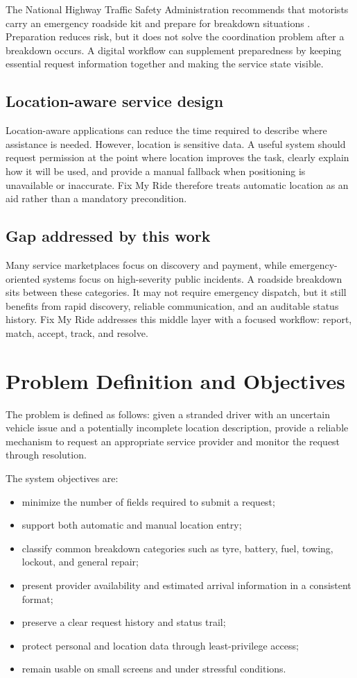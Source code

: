 \documentclass[conference]{IEEEtran}
\begin{document}
The National Highway Traffic Safety Administration recommends that motorists carry an emergency roadside kit and prepare for breakdown situations \cite{nhtsa2026}. Preparation reduces risk, but it does not solve the coordination problem after a breakdown occurs. A digital workflow can supplement preparedness by keeping essential request information together and making the service state visible.

\subsection{Location-aware service design}
Location-aware applications can reduce the time required to describe where assistance is needed. However, location is sensitive data. A useful system should request permission at the point where location improves the task, clearly explain how it will be used, and provide a manual fallback when positioning is unavailable or inaccurate. Fix My Ride therefore treats automatic location as an aid rather than a mandatory precondition.

\subsection{Gap addressed by this work}
Many service marketplaces focus on discovery and payment, while emergency-oriented systems focus on high-severity public incidents. A roadside breakdown sits between these categories. It may not require emergency dispatch, but it still benefits from rapid discovery, reliable communication, and an auditable status history. Fix My Ride addresses this middle layer with a focused workflow: report, match, accept, track, and resolve.

\section{Problem Definition and Objectives}
The problem is defined as follows: given a stranded driver with an uncertain vehicle issue and a potentially incomplete location description, provide a reliable mechanism to request an appropriate service provider and monitor the request through resolution.

The system objectives are:
\begin{itemize}
    \item minimize the number of fields required to submit a request;
    \item support both automatic and manual location entry;
    \item classify common breakdown categories such as tyre, battery, fuel, towing, lockout, and general repair;
    \item present provider availability and estimated arrival information in a consistent format;
    \item preserve a clear request history and status trail;
    \item protect personal and location data through least-privilege access;
    \item remain usable on small screens and under stressful conditions.
\end{itemize}
\end{document}
